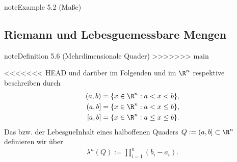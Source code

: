 \documentclass[letterpaper,10pt,english]{jupyterBook}
\begin{document}
\begin{sphinxadmonition}{note}{Example 5.2 (Maße)}
\subsection{Riemann\sphinxhyphen{} und Lebesgue\sphinxhyphen{}messbare Mengen}
\label{\detokenize{masstheorie/masstheorie:riemann-und-lebesgue-messbare-mengen}}\label{masstheorie/masstheorie:definition-6}
\begin{sphinxadmonition}{note}{Definition 5.6 (Mehrdimensionale Quader)}
>>>>>>> main



\sphinxAtStartPar
<<<<<<< HEAD
und darüber im Folgenden  und  im \(\R^n\) respektive beschreiben durch
\begin{equation*}
\begin{split}(a,b) &= \lbrace x \in \R^n : a < x < b \rbrace,\\
(a,b] &= \lbrace x \in \R^n : a < x \leq b \rbrace,\\
[a,b] &= \lbrace x \in \R^n : a \leq x \leq b \rbrace.\end{split}
\end{equation*}
\sphinxAtStartPar
Das  bzw. der Lebesgue\sphinxhyphen{}Inhalt eines halboffenen Quaders \(Q := (a,b] \subset \R^n\) definieren wir über
\begin{equation*}
\begin{split}\lambda^n(Q) := \prod_{i=1}^n (b_i - a_i).\end{split}
\end{equation*}\end{sphinxadmonition}


\end{sphinxadmonition}
\end{document}
